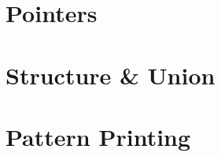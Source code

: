 \documentclass{report}
\begin{document}
\chapter{Pointers}
\chapter{Structure \& Union}
\chapter{Pattern Printing}
\end{document}

